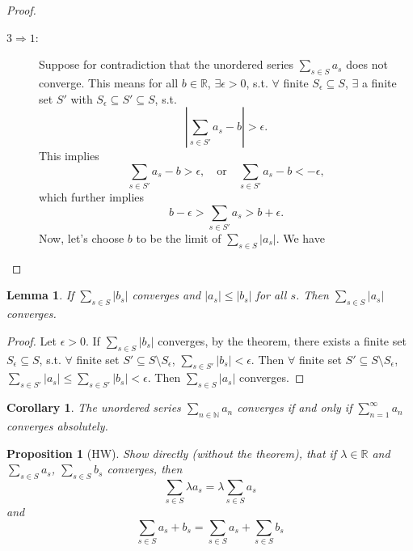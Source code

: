\documentclass[12pt]{article}
\theoremstyle{plain}
\newtheorem*{lemma}{Lemma}
\newtheorem*{prop}{Proposition}
\newtheorem*{corollary}{Corollary}
\theoremstyle{definition}
\begin{document}
\begin{proof}
\begin{description}
        \item[$3\Rightarrow 1$:]
            Suppose for contradiction that the unordered series $\sum_{s\in S} a_s$ does not converge.
            This means for all $b\in\mathbb{R}$, $\exists \epsilon>0$, s.t. $\forall$ finite
            $S_\epsilon\subseteq S$, $\exists$ a finite set $S'$ with $S_{\epsilon}\subseteq S'\subseteq
            S$, s.t.
            \[\left|\sum_{s\in S'}a_s - b\right|>\epsilon.\]
            This implies
            \[\sum_{s\in S'}a_s - b>\epsilon,\quad\text{or}\quad \sum_{s\in S'}a_s - b<-\epsilon,\]
            which further implies
            \[b-\epsilon>\sum_{s\in S'}a_s >b+\epsilon.\]
            Now, let's choose $b$ to be the limit of $\sum_{s\in S}|a_s|$.
            We have
    \end{description}
\end{proof}


\begin{lemma}
    If $\sum_{s\in S}|b_s|$ converges and $|a_s|\leq |b_s|$ for all $s$.
    Then $\sum_{s\in S}|a_s|$ converges.
\end{lemma}
\begin{proof}
    Let $\epsilon>0$.
    If $\sum_{s\in S}|b_s|$ converges, by the theorem, there exists a finite set $S_\epsilon\subseteq S$,
    s.t. $\forall$ finite set $S'\subseteq S\setminus S_{\epsilon}$, $\sum_{s\in S'}|b_s|<\epsilon$.
    Then $\forall$ finite set $S'\subseteq S\setminus S_{\epsilon}$, $\sum_{s\in S'}|a_s| \leq \sum_{s\in
    S'}|b_s|<\epsilon$.
    Then $\sum_{s\in S}|a_s|$ converges.
\end{proof}

\begin{corollary}
    The unordered series $\sum_{n\in\mathbb{N}}a_n$ converges if and only if $\sum_{n=1}^\infty a_n$
    converges absolutely.
\end{corollary}

\begin{prop}[HW]
    Show directly (without the theorem), that if $\lambda\in\mathbb{R}$ and $\sum_{s\in S}a_s$,
    $\sum_{s\in S}b_s$ converges, then
    $$\sum_{s\in S}\lambda a_s = \lambda \sum _{s\in S} a_s$$ and $$\sum_{s\in S}a_s+b_s=\sum_{s\in
    S}a_s+\sum_{s\in S}b_s$$
\end{prop}
\end{document}
